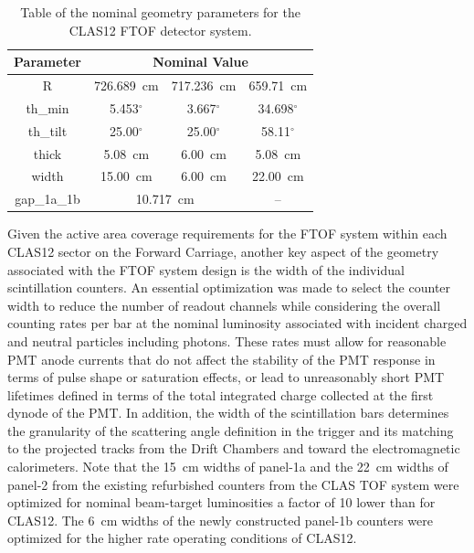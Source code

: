 \documentclass{elsart}
\begin{document}
\begin{table}[htbp]
\begin{center}
\begin{tabular} {c|c|c|c} \hline
Parameter & \multicolumn{3}{c}{Nominal Value}\\ \hline
R                & 726.689~cm & 717.236~cm & 659.71~cm\\ \hline
th\_min    & 5.453$^\circ$ & 3.667$^\circ$ & 34.698$^\circ$ \\ \hline
th\_tilt    & 25.00$^\circ$ & 25.00$^\circ$ & 58.11$^\circ$ \\ \hline
thick        & 5.08~cm           & 6.00~cm         & 5.08~cm \\ \hline
width       & 15.00~cm         & 6.00~cm         & 22.00~cm \\ \hline
gap\_1a\_1b & \multicolumn{2}{c|}{10.717~cm} &  -- \\ \hline
\end{tabular}
\caption{Table of the nominal geometry parameters for the CLAS12 FTOF detector system.}
\label{geom-parms}
\end{center}
\end{table}

Given the active area coverage requirements for the FTOF system within each CLAS12 sector on the
Forward Carriage, another key aspect of the geometry associated with the FTOF system design is
the width of the individual scintillation counters. An essential optimization was made to select the
counter width to reduce the number of readout channels while considering the overall counting rates per
bar at the nominal luminosity associated with incident charged and neutral particles including photons.
These rates must allow for reasonable PMT anode currents that do not affect the stability of the PMT
response in terms of pulse shape or saturation effects, or lead to unreasonably short PMT lifetimes
defined in terms of the total integrated charge collected at the first dynode of the PMT. In addition, the
width of the scintillation bars determines the granularity of the scattering angle definition in the trigger
and its matching to the projected tracks from the Drift Chambers and toward the electromagnetic
calorimeters. Note that the 15~cm widths of panel-1a and the 22~cm widths of panel-2 from the existing
refurbished counters from the CLAS TOF system were optimized for nominal beam-target luminosities a
factor of 10 lower than for CLAS12. The 6~cm widths of the newly constructed panel-1b counters were
optimized for the higher rate operating conditions of CLAS12.
\end{document}
